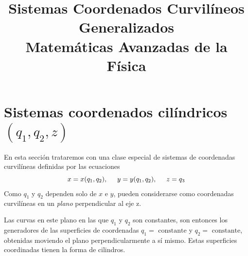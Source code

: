
\newcommand{\sech}{\mathrm{sech} \,}
\usepackage{tikz-3dplot}
\title{Sistemas Coordenados Curvilíneos Generalizados \\ {\large Matemáticas Avanzadas de la Física}}
\date{ }

\renewcommand\labelenumii{\theenumi.{\arabic{enumii}}}
\maketitle
\fontsize{14}{14}\selectfont
\section{Sistemas coordenados cilíndricos $(q_{1}, q_{2}, z)$}
En esta sección trataremos con una clase especial de sistemas de coordenadas curvilíneas definidas por las ecuaciones
\begin{equation}
x = x(q_{1}, q_{2}), \hspace{0.5cm} y = y(q_{1}, q_{2}), \hspace{0.5cm} z = q_{3}
\label{eq:ecuacion_A_08_01}
\end{equation}
Como $q_{1}$ y $q_{2}$ dependen solo de $x$ e $y$, pueden considerarse como coordenadas curvilíneas en un \emph{plano} perpendicular al eje z.

Las curvas en este plano en las que $q_{1}$ y $q_{2}$ son constantes, son entonces los generadores de las superficies de coordenadas $q_{1} = \mbox{ constante}$ y $q_{2} = \mbox{ constante}$, obtenidas moviendo el plano perpendicularmente a sí mismo. Estas superficies coordinadas tienen la forma de cilindros. 

